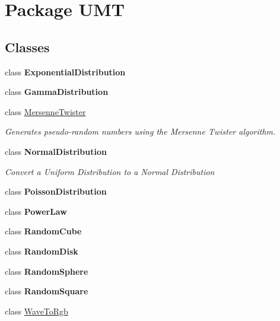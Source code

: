 \hypertarget{namespace_u_m_t}{\section{Package U\+M\+T}
\label{namespace_u_m_t}
}
\subsection*{Classes}
\begin{DoxyCompactItemize}
\item 
class {\bfseries Exponential\+Distribution}
\item 
class {\bfseries Gamma\+Distribution}
\item 
class \hyperlink{class_u_m_t_1_1_mersenne_twister}{Mersenne\+Twister}
\begin{DoxyCompactList}\small\item\em Generates pseudo-\/random numbers using the Mersenne Twister algorithm. \end{DoxyCompactList}\item 
class {\bfseries Normal\+Distribution}
\begin{DoxyCompactList}\small\item\em Convert a Uniform Distribution to a Normal Distribution \end{DoxyCompactList}\item 
class {\bfseries Poisson\+Distribution}
\item 
class {\bfseries Power\+Law}
\item 
class {\bfseries Random\+Cube}
\item 
class {\bfseries Random\+Disk}
\item 
class {\bfseries Random\+Sphere}
\item 
class {\bfseries Random\+Square}
\item 
class \hyperlink{class_u_m_t_1_1_wave_to_rgb}{Wave\+To\+Rgb}
\end{DoxyCompactItemize}
